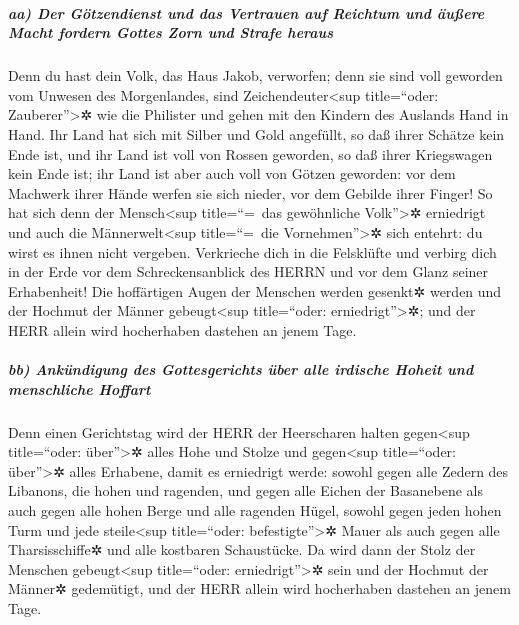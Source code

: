 \hypertarget{aa-der-guxf6tzendienst-und-das-vertrauen-auf-reichtum-und-uxe4uuxdfere-macht-fordern-gottes-zorn-und-strafe-heraus}{%
\subparagraph{aa) Der Götzendienst und das Vertrauen auf Reichtum und
äußere Macht fordern Gottes Zorn und Strafe
heraus}\label{aa-der-guxf6tzendienst-und-das-vertrauen-auf-reichtum-und-uxe4uuxdfere-macht-fordern-gottes-zorn-und-strafe-heraus}}

Denn du hast dein Volk, das Haus Jakob, verworfen; denn
sie sind voll geworden vom Unwesen des Morgenlandes, sind
Zeichendeuter\textless sup title=``oder: Zauberer''\textgreater✲ wie die
Philister und gehen mit den Kindern des Auslands Hand in Hand.
Ihr Land hat sich mit Silber und Gold angefüllt, so daß
ihrer Schätze kein Ende ist, und ihr Land ist voll von Rossen geworden,
so daß ihrer Kriegswagen kein Ende ist; ihr Land ist aber
auch voll von Götzen geworden: vor dem Machwerk ihrer Hände werfen sie
sich nieder, vor dem Gebilde ihrer Finger! So hat sich
denn der Mensch\textless sup title=``=~das gewöhnliche
Volk''\textgreater✲ erniedrigt und auch die Männerwelt\textless sup
title=``=~die Vornehmen''\textgreater✲ sich entehrt: du wirst es ihnen
nicht vergeben. Verkrieche dich in die Felsklüfte und
verbirg dich in der Erde vor dem Schreckensanblick des HERRN und vor dem
Glanz seiner Erhabenheit! Die hoffärtigen Augen der
Menschen werden gesenkt✲ werden und der Hochmut der Männer
gebeugt\textless sup title=``oder: erniedrigt''\textgreater✲; und der
HERR allein wird hocherhaben dastehen an jenem Tage.

\hypertarget{bb-ankuxfcndigung-des-gottesgerichts-uxfcber-alle-irdische-hoheit-und-menschliche-hoffart}{%
\subparagraph{bb) Ankündigung des Gottesgerichts über alle irdische
Hoheit und menschliche
Hoffart}\label{bb-ankuxfcndigung-des-gottesgerichts-uxfcber-alle-irdische-hoheit-und-menschliche-hoffart}}

Denn einen Gerichtstag wird der HERR der Heerscharen
halten gegen\textless sup title=``oder: über''\textgreater✲ alles Hohe
und Stolze und gegen\textless sup title=``oder: über''\textgreater✲
alles Erhabene, damit es erniedrigt werde: sowohl gegen
alle Zedern des Libanons, die hohen und ragenden, und gegen alle Eichen
der Basanebene als auch gegen alle hohen Berge und alle
ragenden Hügel, sowohl gegen jeden hohen Turm und jede
steile\textless sup title=``oder: befestigte''\textgreater✲ Mauer
als auch gegen alle Tharsisschiffe✲ und alle kostbaren
Schaustücke. Da wird dann der Stolz der Menschen
gebeugt\textless sup title=``oder: erniedrigt''\textgreater✲ sein und
der Hochmut der Männer✲ gedemütigt, und der HERR allein wird hocherhaben
dastehen an jenem Tage.

